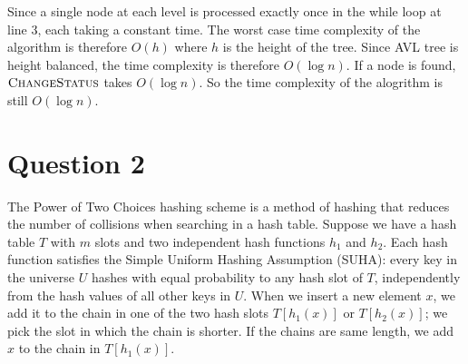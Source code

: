 \documentclass[11pt]{article}
\begin{document}
\begin{enumerate}
\begin{enumerate}
    \begin{algorithm}[H]
      \caption{$ $}

    \end{algorithm}
  \end{enumerate}
  Since a single node at each level is processed exactly once in the while loop at line 3, each taking a constant time. The worst case time complexity of the algorithm is therefore $O(h)$ where $h$ is the height of the tree. Since AVL tree is height balanced, the time complexity is therefore $O(\log n)$. If a node is found, $\textsc{ChangeStatus}$ takes $O(\log n)$. So the time complexity of the alogrithm is still $O(\log n)$.

\end{enumerate}


\section*{Question 2}

The Power of Two Choices hashing scheme is a method of hashing that reduces the number of collisions when searching in a hash table. Suppose we have a hash table $T$ with $m$ slots and two independent hash functions $h_1$ and $h_2$. Each hash function satisfies the Simple Uniform Hashing Assumption (SUHA): every key in the universe $U$ hashes with equal probability to any hash slot of $T$, independently from the hash values of all other keys in $U$. When we insert a new element $x$, we add it to the chain in one of the two hash slots $T[h_1(x)]$ or $T[h_2(x)]$; we pick the slot in which the chain is shorter. If the chains are same length, we add $x$ to the chain in $T[h_1(x)]$.
\end{document}
